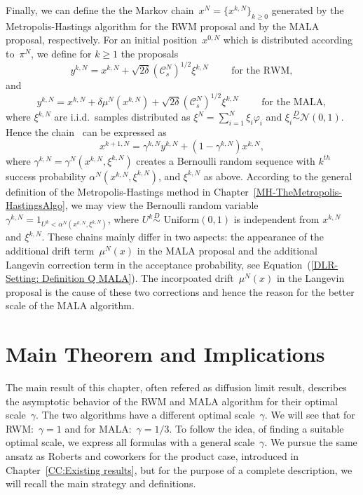 Finally, we can define the the Markov chain~$x^N = \{ x^{k,N} \}_{k \geq 0}$  generated by the Metropolis-Hastings algorithm for the RWM proposal and by the MALA proposal, respectively. For an initial position~$x^{0,N}$ which is distributed according to~$\pi^N$, we define for $k \geq 1$ the proposals
\begin{equation}
 y^{k,N} = x^{k,N} + \sqrt{2 \delta} (\mathcal{C}_s^{N})^{1/2} \xi^{k,N} \qquad \text{ for the RWM},
\end{equation}
and
\begin{equation}
 y^{k,N} = x^{k,N} + \delta \mu^{N}(x^{k,N}) + \sqrt{2 \delta} (\mathcal{C}_s^{N})^{1/2} \xi^{k,N} \qquad \text{ for the MALA},
\end{equation}
where $\xi^{k,N}$ are i.i.d.\, samples distributed as $\xi^{N} = \sum_{i=1}^{N} \xi_i \varphi_i$ and $\xi_i \stackrel{D}{\sim} \mathcal{N}(0,1)$. Hence the chain~\autocite[Equation~(2.12) and~(2.20), respectively]{Mattingly2010, Pillai2012} can be expressed as
\begin{equation}
\label{DLR-MH chain from algorithm - general form}
 x^{k+1,N} = \gamma^{k,N} y^{k,N} + (1 - \gamma^{k,N}) x^{k,N},
\end{equation}
where  $\gamma^{k,N}= \gamma^{N}(x^{k,N}, \xi^{k,N})$ creates a Bernoulli random sequence with $k^{th}$ success probability $\alpha^{N}(x^{k,N}, \xi^{k,N})$, and $\xi^{k,N}$ as above. According to the general definition of the Metropolis-Hastings method in Chapter~\ref{MH-TheMetropolis-HastingsAlgo}, we may view the Bernoulli random variable~$\gamma^{k,N} = 1_{U^k < \alpha^N(x^{k,N}, \xi^{k,N})}$, where $U^k\stackrel{D}{\sim} \text{ Uniform}(0,1)$ is independent from $x^{k,N}$ and $\xi^{k,N}$. These chains mainly differ in two aspects: the appearance of the additional drift term~$\mu^{N}(x)$ in the MALA proposal and the additional Langevin correction term in the acceptance probability, see Equation~(\ref{DLR-Setting: Definition Q MALA}). The incorpoated drift~$\mu^N(x)$ in the Langevin proposal is the cause of these two corrections and hence the reason for the better scale of the MALA algorithm. 


\section{Main Theorem and Implications}
\label{sec:DLR-Main theorem}

The main result of this chapter, often refered as diffusion limit result, describes the asymptotic behavior of the RWM and MALA algorithm for their optimal scale~$\gamma$. The two algorithms have a different optimal scale~$\gamma$. We will see that for RWM:~$\gamma = 1$ and for MALA:~$\gamma = 1/3$. To follow the idea, of finding a suitable optimal scale, we express all formulas with a general scale~$\gamma$. We pursue the same ansatz as Roberts and coworkers for the product case, introduced in Chapter~\ref{CC:Existing results}, but for the purpose of a complete description, we will recall the main strategy and definitions.

